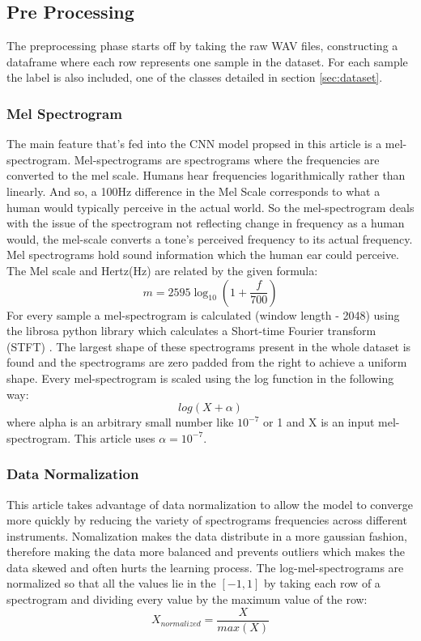 \documentclass[a4paper]{article}
\begin{document}
\subsection{Pre Processing} \label{ssec:preprocessing}
The preprocessing phase starts off by taking the raw WAV files, constructing a dataframe where each row represents one sample in the dataset. For each sample the label is also included, one of the classes detailed in section \ref{sec:dataset}.
\subsubsection{Mel Spectrogram} \label{sssec:mel-spectrogram}
The main feature that's fed into the CNN model propsed in this article is a mel-spectrogram.
Mel-spectrograms are spectrograms where the frequencies are converted to the mel scale.
Humans hear frequencies logarithmically rather than linearly. And so,
a 100Hz difference in the Mel Scale corresponds to what
a human would typically perceive in the actual world. So the mel-spectrogram deals with the issue of the spectrogram not reflecting change in frequency as a human would, the mel-scale converts a tone’s perceived frequency to its actual frequency.
Mel spectrograms hold sound information which the human ear could perceive. The Mel scale and Hertz(Hz) are
related by the given formula:
\[ m = 2595\log_{10}(1 + \frac{f}{700}) \]
For every sample a mel-spectrogram is calculated (window length - 2048) using the librosa python library which calculates a Short-time Fourier transform (STFT) .
The largest shape of these spectrograms present in the whole dataset is found and the spectrograms are zero padded from the right to achieve a uniform shape.
Every mel-spectrogram is scaled using the log function \cite{lognorm} in the following way: \[log(X + \alpha)\] where alpha is an arbitrary small number like $10^{-7}$ or 1 and X is an input mel-spectrogram. This article uses $\alpha = 10^{-7}$.

\subsubsection{Data Normalization}
This article takes advantage of data normalization to allow the model to converge more quickly by reducing the variety of spectrograms frequencies across different instruments. Nomalization makes the data distribute in a more gaussian fashion, therefore making the data more balanced and prevents outliers which makes the data skewed and often hurts the learning process.
The log-mel-spectrograms are normalized so that all the values lie in the $[-1, 1]$ by taking each row of a spectrogram and dividing every value by the maximum value of the row: \[X_{normalized} = \frac{X}{max(X)}\]
\end{document}
